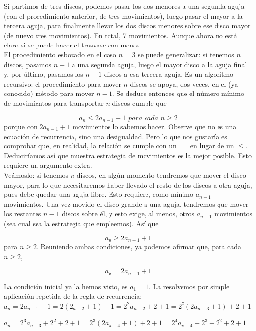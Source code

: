 \documentclass{article}
\begin{document}
Si partimos de tres discos, podemos pasar los dos menores a una segunda aguja (con el procedimiento anterior, de tres movimientos), luego pasar el mayor a la tercera aguja, para finalmente llevar los dos discos menores sobre ese disco mayor (de nuevo tres movimientos). En total, 7 movimientos. Aunque ahora no está claro si se puede hacer el trasvase con menos.\\

El procedimiento esbozado en el caso $n=3$ se puede generalizar: si tenemos $n$ discos, pasamos $n-1$ a una segunda aguja, luego el mayor disco a la aguja final y, por último, pasamos los $n-1$ discos a esa tercera aguja. Es un algoritmo recursivo: el procedimiento para mover $n$ discos se apoya, dos veces, en el (ya conocido) método para mover $n-1$. Se deduce entonces que el número mínimo de movimientos para transportar $n$ discos cumple que

$$a_n \leq 2a_{n-1} + 1 \textit{   para cada } n \geq 2 $$
porque con $2a_{n-1} + 1$ movimientos lo sabemos hacer. Observe que no es una ecuación de recurrencia, sino una desigualdad. Pero lo que nos gustaría es comprobar que, en realidad, la
relación se cumple con un $=$ en lugar de un $\leq$. Deduciríamos así que muestra estrategia de movimientos es la mejor posible. Esto requiere un argumento extra.\\

Veámoslo: si tenemos $n$ discos, en algún momento tendremos que mover el disco mayor, para lo que necesitaremos haber llevado el resto de los discos a otra aguja, pues debe quedar una aguja libre. Esto requiere, como mínimo $a_{n-1}$ movimientos. Una vez movido el disco grande a una aguja, tendremos que mover los restantes $n-1$ discos sobre él, y esto exige, al menos, otros $a_{n-1}$ movimientos (sea cual sea la estrategia que empleemos). Así que 

$$a_n \geq 2a_{n-1} + 1$$
para $n \geq 2$. Reuniendo ambas condiciones, ya podemos afirmar que, para cada $n \geq 2$,

$$a_n = 2a_{n-1} + 1$$

La condición inicial ya la hemos visto, es $a_1 = 1$. La resolvemos por simple aplicación repetida de la regla de recurrencia:\\

$a_n = 2 a_{n-1} + 1 = 2(2_{n-2} + 1) +1 = 2^2 a_{n-2} +2 +1 = 2^2(2a_{n-3}+1) +2+1$

$a_n = 2^3 a_{n-3} + 2^2 + 2 +1 =2^3 (2a_{n-4}+1)+2+1 = 2^4 a_{n-4} + 2^3+2^2+2+1$
\end{document}

